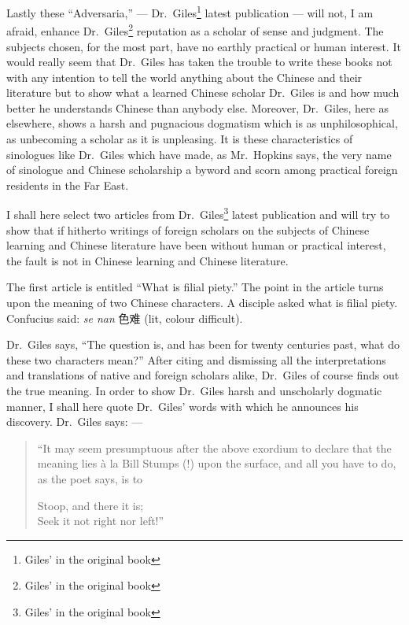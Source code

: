 Lastly these ``Adversaria,'' --- Dr.~Giles\footnote{Giles' in the original book}  latest publication --- will not, I am afraid, enhance Dr.~Giles\footnote{Giles' in the original book}  reputation as a scholar of sense and judgment.
The subjects chosen, for the most part, have no earthly practical or human interest.
It would really seem that Dr.~Giles has taken the trouble to write these books not with any intention to tell the world anything about the Chinese and their literature but to show what a learned Chinese scholar Dr.~Giles is and how much better he understands Chinese than anybody else.
Moreover, Dr.~Giles, here as elsewhere, shows a harsh and pugnacious dogmatism which is as unphilosophical, as unbecoming a scholar as it is unpleasing.
It is these characteristics of sinologues like Dr.~Giles which have made, as Mr.~Hopkins says, the very name of sinologue and Chinese scholarship a byword and scorn among practical foreign residents in the Far East.

I shall here select two articles from Dr.~Giles\footnote{Giles' in the original book}  latest publication and will try to show that if hitherto writings of foreign scholars on the subjects of Chinese learning and Chinese literature have been without human or practical interest, the fault is not in Chinese learning and Chinese literature.

The first article is entitled ``What is filial piety.'' 
The point in the article turns upon the meaning of two Chinese characters.
A disciple asked what is filial piety.
Confucius said: \emph{se nan} 色难 (lit, colour difficult).

Dr.~Giles says, ``The question is, and has been for twenty centuries past, what do these two characters mean?''
After citing and dismissing all the interpretations and translations of native and foreign scholars alike, Dr.~Giles of course finds out the true meaning.
In order to show Dr.~Giles  harsh and unscholarly dogmatic manner, I shall here quote Dr.~Giles' words with which he announces his discovery. Dr.~Giles says: ---
\begin{quote}\footnotesize
    ``It may seem presumptuous after the above exordium to declare that the meaning lies \`a la  Bill Stumps (!) upon the surface, and all you have to do, as the poet says, is to
\begin{center}
    Stoop, and there it is; \\
    Seek it not right nor left!''
\end{center}
\end{quote}

